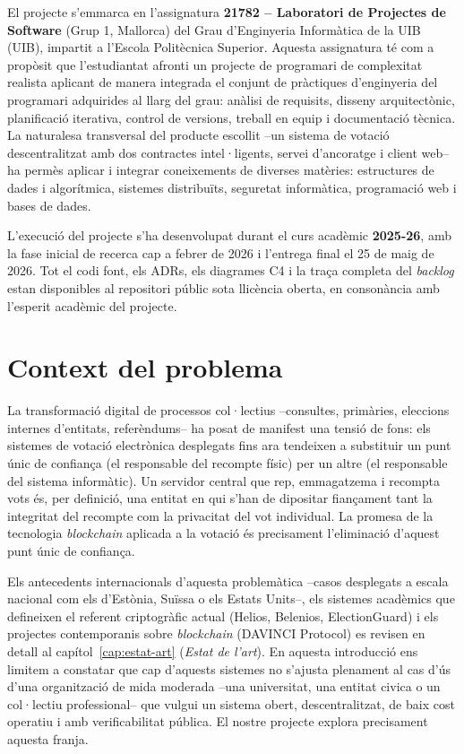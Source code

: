 El projecte s'emmarca en l'assignatura \textbf{21782 -- Laboratori de
Projectes de Software} (Grup 1, Mallorca) del Grau d'Enginyeria
Informàtica de la \acl{UIB} (\ac{UIB}), impartit a l'Escola Politècnica
Superior. Aquesta assignatura té com a propòsit que l'estudiantat
afronti un projecte de programari de complexitat realista aplicant de
manera integrada el conjunt de pràctiques d'enginyeria del programari
adquirides al llarg del grau: anàlisi de requisits, disseny
arquitectònic, planificació iterativa, control de versions, treball en
equip i documentació tècnica. La naturalesa transversal del producte
escollit --un sistema de votació descentralitzat amb dos contractes
intel·ligents, servei d'ancoratge i client web-- ha permès aplicar i
integrar coneixements de diverses matèries: estructures de dades i
algorítmica, sistemes distribuïts, seguretat informàtica, programació
web i bases de dades.

L'execució del projecte s'ha desenvolupat durant el curs acadèmic
\textbf{2025-26}, amb la fase inicial de recerca cap a febrer de 2026 i
l'entrega final el 25 de maig de 2026. Tot el codi font, els
\acp{ADR}, els diagrames C4 i la traça completa del \emph{backlog} estan
disponibles al repositori públic \cite{demochainrepo} sota llicència
oberta, en consonància amb l'esperit acadèmic del projecte.

\section{Context del problema}
\label{sec:context-problema}

La transformació digital de processos col·lectius --consultes,
primàries, eleccions internes d'entitats, referèndums-- ha posat de
manifest una tensió de fons: els sistemes de votació electrònica
desplegats fins ara tendeixen a substituir un punt únic de confiança
(el responsable del recompte físic) per un altre (el responsable del
sistema informàtic). Un servidor central que rep, emmagatzema i
recompta vots és, per definició, una entitat en qui s'han de dipositar
fiançament tant la integritat del recompte com la privacitat del vot
individual. La promesa de la tecnologia \emph{blockchain} aplicada a
la votació és precisament l'eliminació d'aquest punt únic de
confiança.

Els antecedents internacionals d'aquesta problemàtica --casos
desplegats a escala nacional com els d'Estònia, Suïssa o els Estats
Units--, els sistemes acadèmics que defineixen el referent
criptogràfic actual (Helios, Belenios, ElectionGuard) i els projectes
contemporanis sobre \emph{blockchain} (DAVINCI Protocol) es revisen en
detall al capítol~\ref{cap:estat-art} (\emph{Estat de l'art}). En
aquesta introducció ens limitem a constatar que cap d'aquests sistemes
no s'ajusta plenament al cas d'ús d'una organització de mida moderada
--una universitat, una entitat civica o un col·lectiu professional--
que vulgui un sistema obert, descentralitzat, de baix cost operatiu i
amb verificabilitat pública. El nostre projecte explora precisament
aquesta franja.

